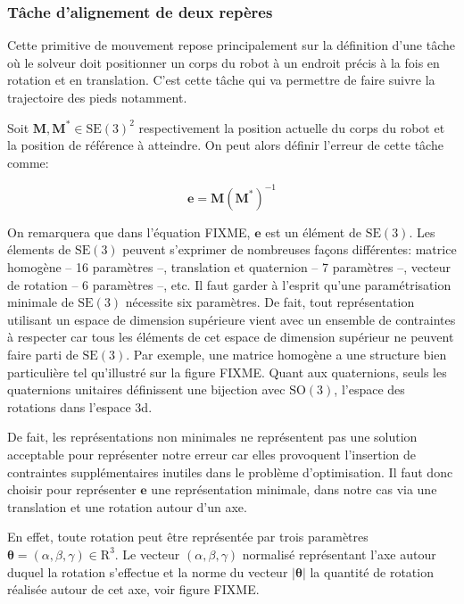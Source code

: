 \subsubsection{Tâche d'alignement de deux repères}

Cette primitive de mouvement repose principalement sur la définition
d'une tâche où le solveur doit positionner un corps du robot à un
endroit précis à la fois en rotation et en translation. C'est cette
tâche qui va permettre de faire suivre la trajectoire des pieds
notamment.


Soit $\mathbf{M}, \mathbf{M}^{*} \in \text{SE}(3)^2$
respectivement la position actuelle du corps du robot et la position
de référence à atteindre. On peut alors définir l'erreur de cette
tâche comme:

\begin{equation}
  \mathbf{e} = \mathbf{M} (\mathbf{M}^{*})^{-1}
\end{equation}

On remarquera que dans l'équation FIXME, $\mathbf{e}$ est un élément
de $\text{SE}(3)$. Les élements de $\text{SE}(3)$ peuvent s'exprimer
de nombreuses façons différentes: matrice homogène -- 16 paramètres
--, translation et quaternion -- 7 paramètres --, vecteur de rotation
-- 6 paramètres --, etc. Il faut garder à l'esprit qu'une
paramétrisation minimale de $\text{SE}(3)$ nécessite six
paramètres. De fait, tout représentation utilisant un espace de
dimension supérieure vient avec un ensemble de contraintes à respecter
car tous les éléments de cet espace de dimension supérieur ne peuvent
faire parti de $\text{SE}(3)$. Par exemple, une matrice homogène a une
structure bien particulière tel qu'illustré sur la figure FIXME. Quant
aux quaternions, seuls les quaternions unitaires définissent une
bijection avec $\text{SO}(3)$, l'espace des rotations dans l'espace
3d.

De fait, les représentations non minimales ne représentent pas une
solution acceptable pour représenter notre erreur car elles provoquent
l'insertion de contraintes supplémentaires inutiles dans le problème
d'optimisation. Il faut donc choisir pour représenter $\mathbf{e}$ une
représentation minimale, dans notre cas via une translation et une
rotation autour d'un axe.

En effet, toute rotation peut être représentée par trois paramètres
\mbox{$\mathbf{\theta} = (\alpha, \beta, \gamma) \in \mathrm{R}^3$}. Le
vecteur $(\alpha, \beta, \gamma)$ normalisé représentant l'axe autour
duquel la rotation s'effectue et la norme du vecteur
$|\mathbf{\theta}|$ la quantité de rotation réalisée autour de cet
axe, voir figure FIXME.

